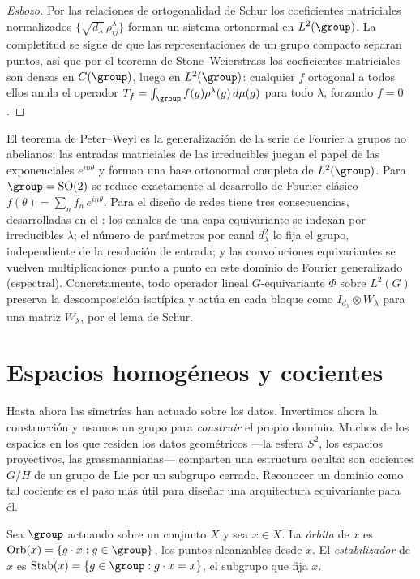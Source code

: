 \begin{proof}[Esbozo]
Por las relaciones de ortogonalidad de Schur los coeficientes matriciales
normalizados $\{\sqrt{d_\lambda}\,\rho^\lambda_{ij}\}$ forman un sistema ortonormal
en $L^2(\group)$. La completitud se sigue de que las representaciones de un grupo
compacto separan puntos, as\'i que por el teorema de Stone--Weierstrass los
coeficientes matriciales son densos en $C(\group)$, luego en $L^2(\group)$:
cualquier $f$ ortogonal a todos ellos anula el operador $T_f = \int_\group
f(g)\rho^\lambda(g)\,d\mu(g)$ para todo $\lambda$, forzando $f = 0$.
\end{proof}

El teorema de Peter--Weyl es la generalizaci\'on de la serie de Fourier a grupos no
abelianos: las entradas matriciales de las irreducibles juegan el papel de las
exponenciales $e^{in\theta}$ y forman una base ortonormal completa de
$L^2(\group)$. Para $\group = \SO(2)$ se reduce exactamente al desarrollo de
Fourier cl\'asico $f(\theta) = \sum_n \hat f_n\,e^{in\theta}$. Para el dise\~no de
redes tiene tres consecuencias, desarrolladas en el : los canales
de una capa equivariante se indexan por irreducibles $\lambda$; el n\'umero de
par\'ametros por canal $d_\lambda^2$ lo fija el grupo, independiente de la
resoluci\'on de entrada; y las convoluciones equivariantes se vuelven
multiplicaciones punto a punto en este dominio de Fourier generalizado (espectral).
Concretamente, todo operador lineal $G$-equivariante $\Phi$ sobre $L^2(G)$ preserva
la descomposici\'on isot\'ipica y act\'ua en cada bloque como $I_{d_\lambda} \otimes
W_\lambda$ para una matriz $W_\lambda$, por el lema de Schur.

\section{Espacios homog\'eneos y cocientes}
\label{sec:found:homogeneous}

Hasta ahora las simetr\'ias han actuado sobre los datos. Invertimos ahora la
construcci\'on y usamos un grupo para \emph{construir} el propio dominio. Muchos de
los espacios en los que residen los datos geom\'etricos ---la esfera $S^2$, los
espacios proyectivos, las grassmannianas--- comparten una estructura oculta: son
cocientes $G/H$ de un grupo de Lie por un subgrupo cerrado. Reconocer un dominio
como tal cociente es el paso m\'as \'util para dise\~nar una arquitectura
equivariante para \'el.

\begin{definition}
\label{def:found:orbit}
Sea $\group$ actuando sobre un conjunto $X$ y sea $x \in X$. La \emph{\'orbita} de
$x$ es $\Orb(x) = \{g \cdot x : g \in \group\}$, los puntos alcanzables desde $x$.
El \emph{estabilizador} de $x$ es $\Stab(x) = \{g \in \group : g \cdot x = x\}$, el
subgrupo que fija $x$.
\end{definition}

